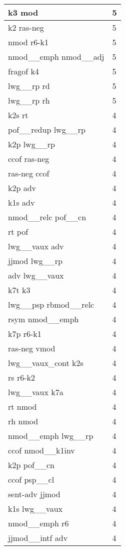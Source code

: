 \documentclass[a4 paper]{article}
\begin{document}
\begin{longtable}{p{}p{}}
k3 mod  & 5 \\ \midrule
k2 ras-neg  & 5 \\ \midrule
nmod r6-k1  & 5 \\ \midrule
nmod\_\_emph nmod\_\_adj  & 5 \\ \midrule
fragof k4  & 5 \\ \midrule
lwg\_\_rp rd  & 5 \\ \midrule
lwg\_\_rp rh  & 5 \\ \midrule
k2s rt  & 4 \\ \midrule
pof\_\_redup lwg\_\_rp  & 4 \\ \midrule
k2p lwg\_\_rp  & 4 \\ \midrule
ccof ras-neg  & 4 \\ \midrule
ras-neg ccof  & 4 \\ \midrule
k2p adv  & 4 \\ \midrule
k1s adv  & 4 \\ \midrule
nmod\_\_relc pof\_\_cn  & 4 \\ \midrule
rt pof  & 4 \\ \midrule
lwg\_\_vaux adv  & 4 \\ \midrule
jjmod lwg\_\_rp  & 4 \\ \midrule
adv lwg\_\_vaux  & 4 \\ \midrule
k7t k3  & 4 \\ \midrule
lwg\_\_psp rbmod\_\_relc  & 4 \\ \midrule
rsym nmod\_\_emph  & 4 \\ \midrule
k7p r6-k1  & 4 \\ \midrule
ras-neg vmod  & 4 \\ \midrule
lwg\_\_vaux\_cont k2s  & 4 \\ \midrule
rs r6-k2  & 4 \\ \midrule
lwg\_\_vaux k7a  & 4 \\ \midrule
rt nmod  & 4 \\ \midrule
rh nmod  & 4 \\ \midrule
nmod\_\_emph lwg\_\_rp  & 4 \\ \midrule
ccof nmod\_\_k1inv  & 4 \\ \midrule
k2p pof\_\_cn  & 4 \\ \midrule
ccof psp\_\_cl  & 4 \\ \midrule
sent-adv jjmod  & 4 \\ \midrule
k1s lwg\_\_vaux  & 4 \\ \midrule
nmod\_\_emph r6  & 4 \\ \midrule
jjmod\_\_intf adv  & 4 \\ \midrule

\end{longtable}
\end{document}
